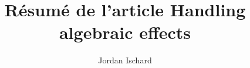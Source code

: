 \usepackage[utf8]{inputenc}
\usepackage{version}

\usepackage{amssymb,amsmath,amsthm}
\usepackage{graphicx}
\usepackage{enumerate}
\usepackage{tikz}
\usetikzlibrary{matrix,arrows}
\usepackage{todonotes}
\usepackage{fullpage}
\usepackage[french,linesnumbered,lined,boxed,commentsnumbered,ruled,vlined]{algorithm2e}

\renewcommand{\contentsname}{Table des matières}   


%
%

\usepackage{tikz}
\usetikzlibrary{positioning}
\usetikzlibrary{calc}

\usepackage[affil-it]{authblk}

\renewcommand*{\Authsep}{, }
\renewcommand*{\Authand}{, }
\renewcommand*{\Authands}{, }

\title{Résumé de l'article \textbf{Handling algebraic effects}}

\author[1]{Jordan Ischard}


\date{}

\newtheorem{theorem}{Théorème}
\newtheorem{lemma}{Lemme}
\newtheorem{corollary}[theorem]{Corollaire}
\newtheorem{claim}[theorem]{Claim}
\newtheorem{proposition}[theorem]{Proposition}
\newtheorem{definition}{Définition}
\theoremstyle{definition}
\newtheorem*{remark}{Remarque}
\newtheorem{exemple}{Exemple}

\newenvironment{proofclaim}{
	\noindent \emph{Proof.}
}{%
	\hfill $\diamond$ \\
}

\newcommand{\probleme}[4]{

    \vspace{0.4cm}
    \fbox{
        \begin{minipage}{0.95 \linewidth}
            \centerline{\textsc{\underline{#1}}}
            \textbf{Entr\'ee} : #2 \\ \textbf{#4} : #3
        \end{minipage}
    }
    \vspace{0.4cm}

}

\newcommand{\RMV}{\todo[inline]{Paragraphe à supprimer}}
\renewcommand*{\proofname}{Preuve}
